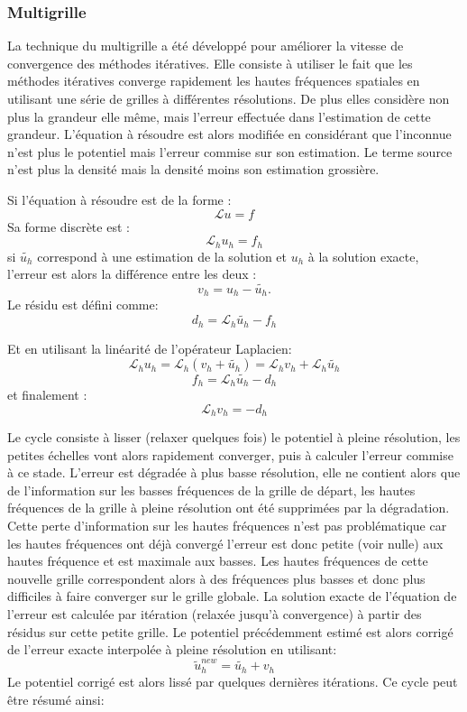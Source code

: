 \subsubsection{Multigrille}

La technique du multigrille a été développé pour améliorer la vitesse de convergence des méthodes itératives.
Elle consiste à utiliser le fait que les méthodes itératives converge rapidement les hautes fréquences spatiales en utilisant une série de grilles à différentes résolutions.
De plus elles considère non plus la grandeur elle même, mais l'erreur effectuée dans l'estimation de cette grandeur.
L'équation à résoudre est alors modifiée en considérant que l'inconnue n'est plus le potentiel mais l'erreur commise sur son estimation. Le terme source n'est plus la densité mais la densité moins son estimation grossière.

Si l'équation à résoudre est de la forme : 
\[ \mathcal{L} u = f \]
Sa forme discrète est :
\[ \mathcal{L}_h u_h = f_h \]
si $\tilde{u_h}$ correspond à une estimation de la solution et $u_h$ à la solution exacte, l'erreur est alors la différence entre les deux : 
\[ v_h = u_h - \tilde{u_h}. \]
Le résidu est défini comme:
\[ d_h = \mathcal{L}_h \tilde{u_h} - f_h \]

Et en utilisant la linéarité de l'opérateur Laplacien:
\[ \mathcal{L}_h u_h = \mathcal{L}_h (v_h + \tilde{u_h} ) = \mathcal{L}_h v_h +\mathcal{L}_h \tilde{u_h} \]
\[ f_h   = \mathcal{L}_h \tilde{u_h} - d_h\]
et finalement :
\[ \mathcal{L}_h v_h = -d_h \]

Le cycle consiste à lisser (relaxer quelques fois) le potentiel à pleine résolution, les petites échelles vont alors rapidement converger, puis à calculer l'erreur commise à ce stade. 
L'erreur est dégradée à plus basse résolution, elle ne contient alors que de l'information sur les basses fréquences de la grille de départ, les hautes fréquences de la grille à pleine résolution ont été supprimées par la dégradation. 
Cette perte d'information sur les hautes fréquences n'est pas problématique car les hautes fréquences ont déjà convergé l'erreur est donc petite (voir nulle) aux hautes fréquence et est maximale aux basses. 
Les hautes fréquences de cette nouvelle grille correspondent alors à des fréquences plus basses et donc plus difficiles à faire converger sur le grille globale. 
La solution exacte de l'équation de l'erreur est calculée par itération (relaxée jusqu'à convergence) à partir des résidus sur cette petite grille. 
Le potentiel précédemment estimé est alors corrigé de l'erreur exacte interpolée à pleine résolution en utilisant:
\[ \tilde{u}_h^{new} = \tilde{u_h} + v_h \]
Le potentiel corrigé est alors lissé par quelques dernières itérations.
Ce cycle peut être résumé ainsi:

